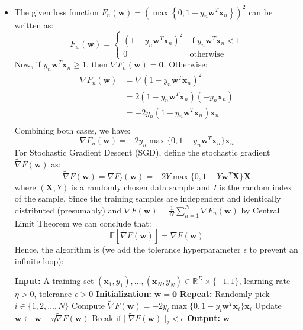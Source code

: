 \documentclass{article}
\newcommand{\mathbi}[1]{\boldsymbol{#1}}
\newcommand{\IndentState}{\State \hspace{2em}}
\begin{document}
  \begin{itemize}
    \item[1.] The given loss function $F_n(\mathbi{w}) = \left( \max \left\{0, 1 - y_n \mathbi{w}^T \mathbi{x}_n \right\} \right)^2$ can be written as:
    \[
      F_w(\mathbi{w}) =
      \begin{cases}
         \left( 1 - y_n \mathbi{w}^T \mathbi{x}_n \right)^2 & \text{if } y_n \mathbi{w}^T \mathbi{x}_n < 1 \\
         0 & \text{otherwise}
      \end{cases}
    \]
    Now, if $y_n \mathbi{w}^T \mathbi{x}_n \ge 1$, then $\nabla F_n(\mathbi{w}) = \mathbi{0}$.
    Otherwise:
    \begin{align*}
      \nabla F_n(\mathbi{w}) &= \nabla \left( 1 - y_n \mathbi{w}^T \mathbi{x}_n \right)^2 \\
      &= 2 \left( 1 - y_n \mathbi{w}^T \mathbi{x}_n \right) (-y_n \mathbi{x}_n) \\
      &= -2 y_n (1 - y_n \mathbi{w}^T \mathbi{x}_n) \mathbi{x}_n \\
    \end{align*}
    Combining both cases, we have:
    \[
      \nabla F_n(\mathbi{w}) = -2 y_n \max\{0, 1 - y_n \mathbi{w}^T \mathbi{x}_n\} \mathbi{x}_n
    \]
    For Stochastic Gradient Descent (SGD), define the stochastic gradient $\tilde{\nabla} F(\mathbi{w})$ as:
    \[
      \tilde{\nabla} F(\mathbi{w}) = \nabla F_I(\mathbi{w}) = -2 Y \max\{0, 1 - Y \mathbi{w}^T \mathbi{X}\} \mathbi{X}
    \]
    where $(\mathbi{X}, Y)$ is a randomly chosen data sample and $I$ is the random index of the sample.
    Since the training samples are independent and identically distributed (presumably) and $\nabla F(\mathbi{w}) = \frac{1}{N} \sum_{n=1}^{N} \nabla F_n(\mathbi{w})$ by Central Limit Theorem we can conclude that:
    \[ \mathbb{E}[\tilde{\nabla} F(\mathbi{w})] = \nabla F(\mathbi{w}) \]
    Hence, the algorithm is (we add the tolerance hyperparameter $\epsilon$ to prevent an infinite loop):
    \begin{algorithm}
      \caption{SGD for minimizing $F(\mathbi{w})$}
      \begin{algorithmic}[1]
        \State \textbf{Input:} A training set $(\mathbi{x}_1, y_1), \dots, (\mathbi{x}_N, y_N) \in \mathbb{R}^D \times \{-1, 1\}$, learning rate $\eta > 0$, tolerance $\epsilon > 0$
        \State \textbf{Initialization:} $\mathbi{w} = \mathbi{0}$
        \State \textbf{Repeat:}
          \IndentState Randomly pick $i \in \{1, 2, \dots, N\}$
          \IndentState Compute $\tilde{\nabla} F(\mathbi{w}) = -2 y_i \max\{0, 1 - y_i \mathbi{w}^T \mathbi{x}_i\} \mathbi{x}_i$
          \IndentState Update $\mathbi{w} \gets \mathbi{w} - \eta \tilde{\nabla} F(\mathbi{w})$
          \IndentState Break if $||\tilde{\nabla} F(\mathbi{w})||_2 < \epsilon$
        \State \textbf{Output:} $\mathbi{w}$
      \end{algorithmic}
    \end{algorithm}


\end{itemize}
\end{document}
